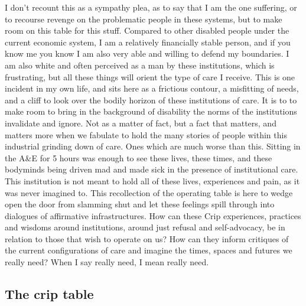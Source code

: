 I don't recount this as a sympathy plea, as to say that I am the one
suffering, or to recourse revenge on the problematic people in these
systems, but to make room on this table for this stuff. Compared to
other disabled people under the current economic system, I am a
relatively financially stable person, and if you know me you know I am
also very able and willing to defend my boundaries. I am also white and
often perceived as a man by these institutions, which is frustrating,
but all these things will orient the type of care I receive. This is one
incident in my own life, and sits here as a frictious contour, a
misfitting of needs, and a cliff to look over the bodily horizon of
these institutions of care. It is to to make room to bring in the
background of disability the norms of the institutions invalidate and
ignore. Not as a matter of fact, but a fact that matters, and matters
more when we fabulate to hold the many stories of people within this
industrial grinding down of care. Ones which are much worse than this.
Sitting in the A\&E for 5 hours was enough to see these lives, these
times, and these bodyminds being driven mad and made sick in the
presence of institutional care. This institution is not meant to hold
all of these lives, experiences and pain, as it was never imagined to.
This recollection of the operating table is here to wedge open the door
from slamming shut and let these feelings spill through into dialogues
of affirmative infrastructures. How can these Crip experiences,
practices and wisdoms around institutions, around just refusal and
self-advocacy, be in relation to those that wish to operate on us? How
can they inform critiques of the current configurations of care and
imagine the times, spaces and futures we really need? When I say really
need, I mean really need.

\hypertarget{the-crip-table}{%
\subsection{The crip table}\label{the-crip-table}}


